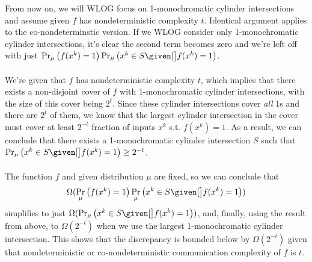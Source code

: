 \documentclass{article}
\begin{document}
\begin{enumerate}
\begin{enumerate}
            From now on, we will WLOG focus on 1-monochromatic cylinder
            intersections and assume given $f$ has nondeterministic complexity
            $t$. Identical argument applies to the co-nondeterminstic version.
            If we WLOG consider only 1-monochromatic cylinder intersections,
            it's clear the second term becomes zero and we're left off with
            just $\Pr_\mu \left(f(x^k) = 1\right) \Pr_\mu \left(x^k \in S
            \given[\big] f(x^k) = 1\right)$.
            \\\\
            We're given that $f$ has nondeterministic complexity $t$, which
            implies that there exists a non-disjoint cover of $f$ with
            1-monochromatic cylinder intersections, with the size of this cover
            being $2^t$. Since these cylinder intersections cover \textit{all}
            1s and there are $2^t$ of them, we know that the largest cylinder
            intersection in the cover must cover at least $2^{-t}$ fraction of
            inputs $x^k$ s.t. $f(x^k) = 1$. As a result, we can conclude that
            there exists a 1-monochromatic cylinder intersection $S$ such that
            $\Pr_\mu \left(x^k \in S \given[\big] f(x^k) = 1\right) \geq
            2^{-t}$.
            \\\\
            The function $f$ and given distribution $\mu$ are fixed, so we can
            conclude that $$\Omega(\Pr_\mu \left(f(x^k) = 1\right) \Pr_\mu
            \left(x^k \in S \given[\big] f(x^k) = 1\right))$$ simplifies to
            just $\Omega(\Pr_\mu\left(x^k \in S \given[\big] f(x^k) =
            1\right))$, and, finally, using the result from above, to
            $\Omega(2^{-t})$ when we use the largest 1-monochromatic cylinder
            intersection. This shows that the discrepancy is bounded below by
            $\Omega(2^{-t})$ given that nondeterministic or co-nondeterministic
            communication complexity of $f$ is $t$.
            \\\\
            \\\\


\end{enumerate}
\end{enumerate}
\end{document}

